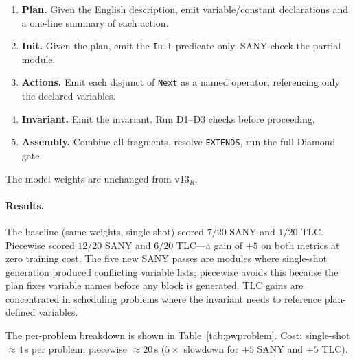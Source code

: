 \documentclass[10pt,twocolumn]{article}
\begin{document}
\begin{enumerate}[leftmargin=1.4em,topsep=2pt,itemsep=1pt]
\item \textbf{Plan.} Given the English description, emit variable/constant
  declarations and a one-line summary of each action.
\item \textbf{Init.} Given the plan, emit the \texttt{Init} predicate only.
  SANY-check the partial module.
\item \textbf{Actions.} Emit each disjunct of \texttt{Next} as a named
  operator, referencing only the declared variables.
\item \textbf{Invariant.} Emit the invariant.
  Run D1--D3 checks before proceeding.
\item \textbf{Assembly.} Combine all fragments, resolve \texttt{EXTENDS}, run
  the full Diamond gate.
\end{enumerate}

The model weights are unchanged from v13$_R$.

\paragraph{Results.}
The baseline (same weights, single-shot) scored $7/20$ SANY and $1/20$ TLC.
Piecewise scored $12/20$ SANY and $6/20$ TLC---a gain of $+5$ on both
metrics at zero training cost.
The five new SANY passes are modules where single-shot generation produced
conflicting variable lists; piecewise avoids this because the plan fixes
variable names before any block is generated.
TLC gains are concentrated in scheduling problems where the invariant needs
to reference plan-defined variables.

The per-problem breakdown is shown in Table~\ref{tab:pwproblem}.
Cost: single-shot ${\approx}4$\,s per problem; piecewise ${\approx}20$\,s
($5\times$ slowdown for $+5$ SANY and $+5$ TLC).
\end{document}
